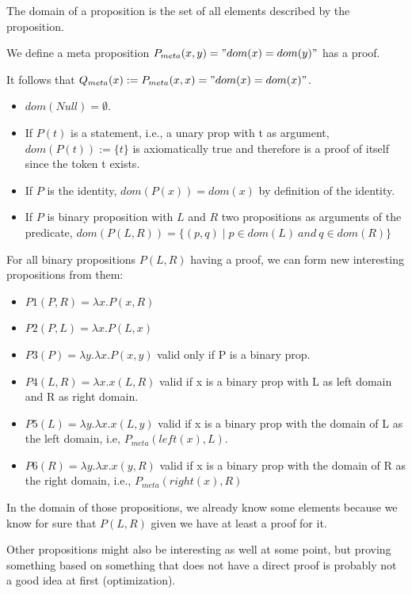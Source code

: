 The domain of a proposition is the set of all elements described by the proposition.

We define a meta proposition $P_{meta}(x, y)="dom(x)=dom(y)"$ has a proof.

It follows that $Q_{meta}(x):=P_{meta}(x, x)="dom(x)=dom(x)"$.

\begin{itemize}
    \item $dom(Null)=\emptyset$.
    \item If $P(t)$ is a statement, i.e., a unary prop with t as argument, $dom(P(t)):=\{t\}$ is axiomatically true and therefore is a proof of itself since the token t exists.
    \item If $P$ is the identity, $dom(P(x))=dom(x)$ by definition of the identity.
    \item If $P$ is binary proposition with $L$ and $R$ two propositions as arguments of the predicate, $dom(P(L, R))=\{(p, q) \mid p \in dom(L)\ and\ q \in dom(R)\}$
\end{itemize}

For all binary propositions $P(L, R)$ having a proof, we can form new interesting propositions from them:

\begin{itemize}
    \item $P1(P, R)=\lambda x.P(x, R)$
    \item $P2(P, L)=\lambda x.P(L, x)$
    \item $P3(P)=\lambda y.\lambda x.P(x, y)$ valid only if P is a binary prop.
    \item $P4(L, R)=\lambda x.x(L, R)$ valid if x is a binary prop with L as left domain and R as right domain.
    \item $P5(L)=\lambda y.\lambda x.x(L, y)$ valid if x is a binary prop with the domain of L as the left domain, i.e, $P_{meta}(left(x), L)$.
    \item $P6(R)=\lambda y.\lambda x.x(y, R)$ valid if x is a binary prop with the domain of R as the right domain, i.e., $P_{meta}(right(x), R)$
\end{itemize}

In the domain of those propositions, we already know some elements because we know for sure that $P(L, R)$ given we have at least a proof for it.

Other propositions might also be interesting as well at some point, but proving something based on something that does not have a direct proof is probably not a good idea at first (optimization).